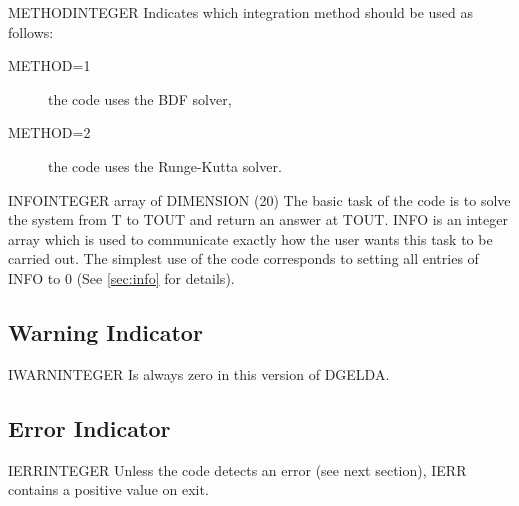 \begin{entry}{METHOD}{INTEGER}
  Indicates which integration method should be used as follows:
  \begin{description}
  \item[METHOD=1] the code uses the BDF solver,
  \item[METHOD=2] the code uses the Runge-Kutta solver.
  \end{description}
\end{entry}
\begin{entry}{INFO}{INTEGER array of DIMENSION (20)}
  The basic task of the code is to solve the system from T to TOUT and
  return an answer at TOUT. INFO is an integer array which is used to
  communicate exactly how the user wants this task to be carried
  out. The simplest use of the code corresponds to setting all entries
  of INFO to 0 (See \ref{sec:info} for details).
\end{entry}

\subsection{Warning Indicator}

\begin{entry}{IWARN}{INTEGER}
  Is always zero in this version of DGELDA.   
\end{entry}

\subsection{Error Indicator}

\begin{entry}{IERR}{INTEGER}
  Unless the code detects an error (see next section), IERR contains a
  positive value on exit.\\
\end{entry}

